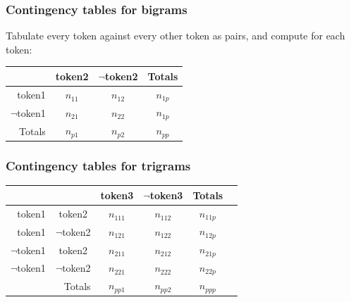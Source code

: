 \documentclass[11pt,handout]{beamer}
\begin{document}
\begin{frame}
 \frametitle{Contingency tables for bigrams}
 Tabulate every token against every other token as pairs, and compute
 for each token:
 \vspace*{1em}

 \centering
 \bgroup
 \def\arraystretch{1.5}%
 \begin{tabular}[h]{|r|c|c|c|}
  \hline
               & token2   & $\neg$token2 & Totals   \\
  \hline
  token1       & $n_{11}$ & $n_{12}$     & $n_{1p}$ \\
  \hline
  $\neg$token1 & $n_{21}$ & $n_{22}$     & $n_{1p}$ \\[.5ex]
  \hline
  Totals       & $n_{p1}$ & $n_{p2}$     & $n_{pp}$ \\
  \hline
 \end{tabular}
 \egroup
\end{frame}

\begin{frame}
 \frametitle{Contingency tables for trigrams}
 \centering
 \bgroup
 \def\arraystretch{1.5}%
 \begin{tabular}[h]{|r|c|c|c|c|c|}
  \hline
               &              & token3    & $\neg$token3 & Totals    \\
  \hline
  token1       & token2       & $n_{111}$ & $n_{112}$    & $n_{11p}$ \\
  \hline
  token1       & $\neg$token2 & $n_{121}$ & $n_{122}$    & $n_{12p}$ \\
  \hline
  $\neg$token1 & token2       & $n_{211}$ & $n_{212}$    & $n_{21p}$ \\
  \hline
  $\neg$token1 & $\neg$token2 & $n_{221}$ & $n_{222}$    & $n_{22p}$ \\[.5ex]
  \hline
  \multicolumn{2}{|r|}{Totals}    &  $n_{pp1}$ & $n_{pp2}$ & $n_{ppp}$ \\
  \hline
 \end{tabular}
 \egroup
\end{frame}
\end{document}
